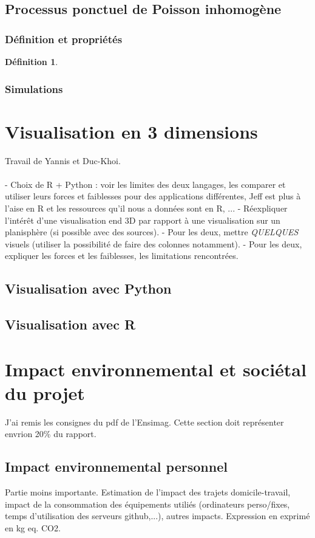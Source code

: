 \documentclass[12pt]{article}
\newtheorem*{defin1}{Définition}
\begin{document}
\subsection{Processus ponctuel de Poisson inhomogène}
\subsubsection*{Définition et propriétés}

\begin{defin1}
\end{defin1}

\subsubsection*{Simulations}



\section{Visualisation en 3 dimensions}
Travail de Yannis et Duc-Khoi.\\
\\
- Choix de R + Python : voir les limites des deux langages, les comparer et utiliser leurs forces et faiblesses pour des applications différentes, Jeff est plus à l'aise en R et les ressources qu'il nous a données sont en R, ...
- Réexpliquer l'intérêt d'une visualisation end 3D par rapport à une visualisation sur un planisphère (si possible avec des sources).
- Pour les deux, mettre \textit{QUELQUES} visuels (utiliser la possibilité de faire des colonnes notamment).
- Pour les deux, expliquer les forces et les faiblesses, les limitations rencontrées.

\subsection{Visualisation avec Python}
\subsection{Visualisation avec R}

\section{Impact environnemental et sociétal du projet}
J'ai remis les consignes du pdf de l'Ensimag. Cette section doit représenter envrion 20\% du rapport.
\subsection*{Impact environnemental personnel}
Partie moins importante.
Estimation de l'impact des trajets domicile-travail, impact de la consommation des équipements utiliés (ordinateurs perso/fixes, temps d'utilisation des serveurs github,...), autres impacts.
Expression en exprimé en kg eq. CO2.
\end{document}
